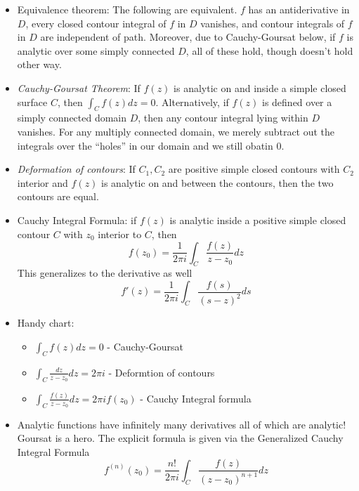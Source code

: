\documentclass[10pt]{report}
\begin{document}
\begin{itemize}
	\item Equivalence theorem: The following are equivalent. $f$ has an antiderivative in $D$, every closed contour integral of $f$ in $D$ vanishes, and contour integrals of $f$ in $D$ are independent of path. Moreover, due to Cauchy-Goursat below, if $f$ is analytic over some simply connected $D$, all of these hold, though doesn't hold other way.
	\item \emph{Cauchy-Goursat Theorem}: If $f(z)$ is analytic on and inside a simple closed surface $C$, then $\int_C f(z) dz = 0$. Alternatively, if $f(z)$ is defined over a simply connected domain $D$, then any contour integral lying within $D$ vanishes. For any multiply connected domain, we merely subtract out the integrals over the ``holes'' in our domain and we still obatin $0$.
	\item \emph{Deformation of contours}: If $C_1,C_2$ are positive simple closed contours with $C_2$ interior and $f(z)$ is analytic on and between the contours, then the two contours are equal.
	\item Cauchy Integral Formula: if $f(z)$ is analytic inside a positive simple closed contour $C$ with $z_0$ interior to $C$, then 
		$$f(z_0) = \frac{1}{2\pi i}\int_C \frac{f(z)}{z-z_0} dz$$
		This generalizes to the derivative as well
		$$f'(z) = \frac{1}{2\pi i} \int_C \frac{f(s)}{(s-z)^2}ds$$
	\item Handy chart:
		\begin{itemize}
			\item $\int_C f(z) dz  = 0$ - Cauchy-Goursat
			\item $\int_C \frac{dz}{z-z_0}  dz= 2\pi i$ - Deformtion of contours
			\item $\int_C \frac{f(z)}{z-z_0} dz = 2\pi i f(z_0)$ - Cauchy Integral formula
		\end{itemize}
	\item Analytic functions have infinitely many derivatives all of which are analytic! Goursat is a hero. The explicit formula is given via the Generalized Cauchy Integral Formula
	$$f^{(n)}(z_0) = \frac{n!}{2\pi i} \int_C \frac{f(z)}{(z-z_0)^{n+1}}dz$$
\end{itemize}
\end{document}
